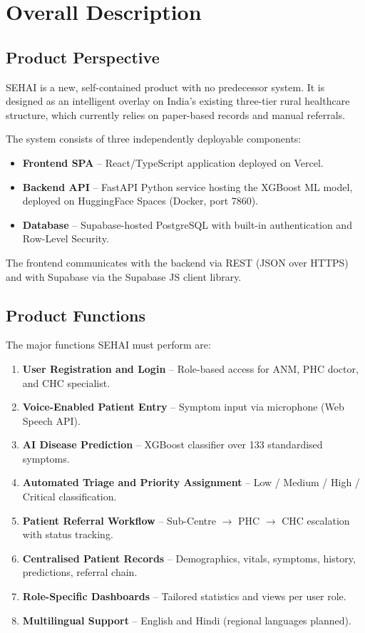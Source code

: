 \documentclass[12pt,a4paper]{article}
\begin{document}
\section{Overall Description}

\subsection{Product Perspective}
SEHAI is a new, self-contained product with no predecessor system. It is designed as an intelligent overlay on India's existing three-tier rural healthcare structure, which currently relies on paper-based records and manual referrals.

The system consists of three independently deployable components:
\begin{itemize}
    \item \textbf{Frontend SPA} -- React/TypeScript application deployed on Vercel.
    \item \textbf{Backend API} -- FastAPI Python service hosting the XGBoost ML model, deployed on HuggingFace Spaces (Docker, port 7860).
    \item \textbf{Database} -- Supabase-hosted PostgreSQL with built-in authentication and Row-Level Security.
\end{itemize}

The frontend communicates with the backend via REST (JSON over HTTPS) and with Supabase via the Supabase JS client library.

\subsection{Product Functions}
The major functions SEHAI must perform are:
\begin{enumerate}
    \item \textbf{User Registration and Login} -- Role-based access for ANM, PHC doctor, and CHC specialist.
    \item \textbf{Voice-Enabled Patient Entry} -- Symptom input via microphone (Web Speech API).
    \item \textbf{AI Disease Prediction} -- XGBoost classifier over 133 standardised symptoms.
    \item \textbf{Automated Triage and Priority Assignment} -- Low / Medium / High / Critical classification.
    \item \textbf{Patient Referral Workflow} -- Sub-Centre $\rightarrow$ PHC $\rightarrow$ CHC escalation with status tracking.
    \item \textbf{Centralised Patient Records} -- Demographics, vitals, symptoms, history, predictions, referral chain.
    \item \textbf{Role-Specific Dashboards} -- Tailored statistics and views per user role.
    \item \textbf{Multilingual Support} -- English and Hindi (regional languages planned).
\end{enumerate}
\end{document}
